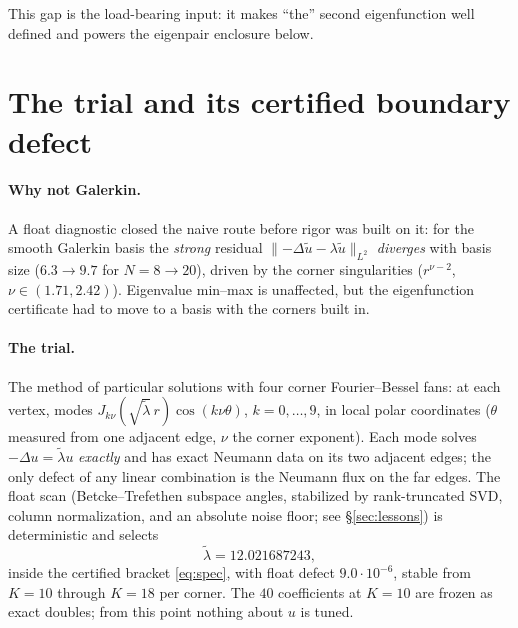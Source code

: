 \documentclass[11pt]{article}
\newcommand{\norm}[1]{\lVert #1 \rVert}
\newcommand{\lam}{\tilde\lambda}
\begin{document}
This gap is the load-bearing input: it makes ``the'' second
eigenfunction well defined and powers the eigenpair enclosure below.

\section{The trial and its certified boundary defect}\label{sec:trial}

\paragraph{Why not Galerkin.}
A float diagnostic closed the naive route before rigor was built on it:
for the smooth Galerkin basis the \emph{strong} residual
$\norm{-\Delta\tilde u-\lambda\tilde u}_{L^2}$ \emph{diverges} with
basis size ($6.3\to9.7$ for $N=8\to20$), driven by the corner
singularities ($r^{\nu-2}$, $\nu\in(1.71,2.42)$). Eigenvalue min--max
is unaffected, but the eigenfunction certificate had to move to a basis
with the corners built in.

\paragraph{The trial.}
The method of particular solutions \cite{FHM,BetckeTrefethen} with four
corner Fourier--Bessel fans: at each vertex, modes
$J_{k\nu}(\sqrt{\lam}\,r)\cos(k\nu\theta)$, $k=0,\dots,9$, in local
polar coordinates ($\theta$ measured from one adjacent edge, $\nu$ the
corner exponent). Each mode solves $-\Delta u=\lam u$ \emph{exactly}
and has exact Neumann data on its two adjacent edges; the only defect
of any linear combination is the Neumann flux on the far edges. The
float scan (Betcke--Trefethen subspace angles, stabilized by
rank-truncated SVD, column normalization, and an absolute noise floor;
see \S\ref{sec:lessons}) is deterministic and selects
\[
\lam = 12.021687243,
\]
inside the certified bracket \eqref{eq:spec}, with float defect
$9.0\cdot10^{-6}$, stable from $K{=}10$ through $K{=}18$ per corner.
The $40$ coefficients at $K{=}10$ are frozen as exact doubles; from
this point nothing about $u$ is tuned.
\end{document}
